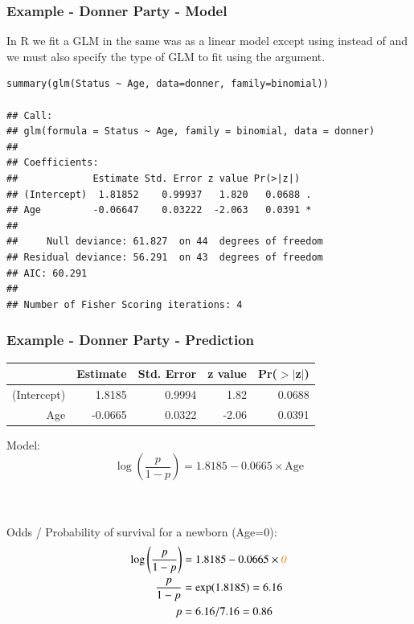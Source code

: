 \begin{frame}[fragile]
\frametitle{Example - Donner Party - Model}
\vspace{-2mm}
In R we fit a GLM in the same was as a linear model except using  instead of  and we must also specify the type of GLM to fit using the  argument.\\

\vspace{2mm}

{\scriptsize
\begin{verbatim}
summary(glm(Status ~ Age, data=donner, family=binomial))

## Call:
## glm(formula = Status ~ Age, family = binomial, data = donner) 
## 
## Coefficients:
##             Estimate Std. Error z value Pr(>|z|)  
## (Intercept)  1.81852    0.99937   1.820   0.0688 .
## Age         -0.06647    0.03222  -2.063   0.0391 *
## 
##     Null deviance: 61.827  on 44  degrees of freedom
## Residual deviance: 56.291  on 43  degrees of freedom
## AIC: 60.291
## 
## Number of Fisher Scoring iterations: 4
\end{verbatim}
}
\end{frame}



\begin{frame}
\frametitle{Example - Donner Party - Prediction}

{\scriptsize
\begin{center}
\begin{tabular}{rrrrr}
  \hline
 & Estimate & Std. Error & z value & Pr($>$$|$z$|$) \\ 
  \hline
(Intercept) & 1.8185 & 0.9994 & 1.82 & 0.0688 \\ 
  Age & -0.0665 & 0.0322 & -2.06 & 0.0391 \\ 
   \hline
\end{tabular}
\end{center}
}

Model:
\[\log\left(\frac{p}{1-p}\right) = 1.8185-0.0665\times \text{Age}\]

\pause
~\\~\\
Odds / Probability of survival for a newborn (Age=0):
\pause
{\scriptsize
\begin{align*}
\log\left(\frac{p}{1-p}\right) &= 1.8185-0.0665\times \textit{\textcolor{orange}{0}}\\
\frac{p}{1-p} &= \exp(1.8185) = 6.16 \\
p &= 6.16/7.16 = 0.86 
\end{align*}
}

\end{frame}

